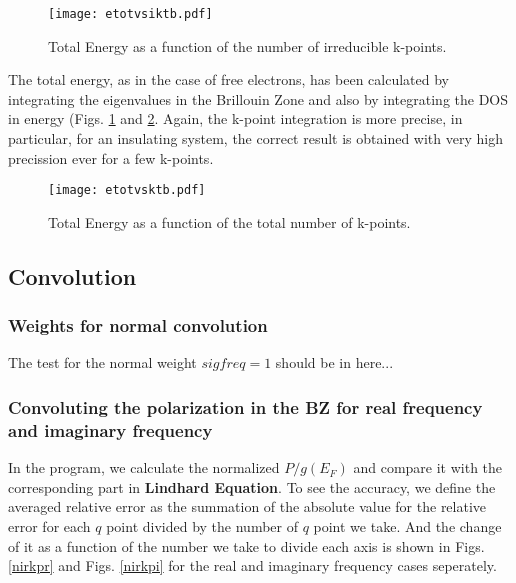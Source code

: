 \begin{figure}[h]
\texttt{[image: etotvsiktb.pdf]}
\caption{Total Energy as a function of the number of irreducible k-points.
} \label{etotvsiktb}
\end{figure}

The total energy, as in the case of free electrons, has been calculated by
integrating the eigenvalues in the Brillouin Zone and also by integrating
the DOS in energy (Figs. \ref{etotvsiktb} and \ref{etotvsktb}. Again, the k-point integration is more precise, in
particular, for an insulating system, the correct result is obtained with
very high precission ever for a few k-points.

\begin{figure}[h]
\texttt{[image: etotvsktb.pdf]}
\caption{Total Energy as a function of the total number of k-points.
} \label{etotvsktb}
\end{figure}


\subsection{Convolution}

\subsubsection{Weights for normal convolution}

The test for the normal weight $sigfreq=1$ should be in here...\\

\subsubsection{Convoluting the polarization in the BZ for real frequency and 
imaginary frequency}

In the program, we calculate the normalized $P/g(E_F)$ and compare it with the 
corresponding part in  \textbf{Lindhard Equation}. To see the accuracy, we define the averaged 
relative error as the summation of the absolute value for the relative error for each $q$ point divided by the number of $q$ point we take. And the change of it as a function of the number we take to divide each axis is 
shown in Figs. \ref{nirkpr} and Figs. \ref{nirkpi} for the real and imaginary frequency cases seperately. \\


